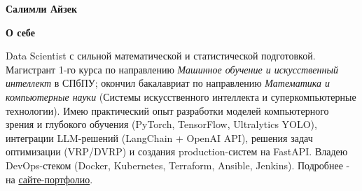 \documentclass[10pt,a4paper]{article}
\newlength{\mainwidth}\setlength{\mainwidth}{0.66\paperwidth}
\newlength{\mainpad}\setlength{\mainpad}{0.75cm}
\newcommand{\mainheading}[1]{%
  \vspace{8pt}%
  {\color{sidebar}\bfseries\Large #1}\par
  \vspace{-5pt}{\color{accent}\rule{\linewidth}{1.6pt}}\par\vspace{5pt}}
\begin{document}
\begin{minipage}[t]{\mainwidth}
  \hspace{\mainpad}%
  \begin{minipage}[t]{\dimexpr\linewidth-1.5\mainpad\relax}
    \vspace{0pt}
    \color{ink}
    {\color{sidebar}\fontsize{30}{34}\selectfont\bfseries Салимли Айзек}\par
    \par

    \mainheading{О себе}
    Data Scientist с сильной математической и статистической подготовкой. Магистрант 1-го курса
    по направлению \emph{Машинное обучение и искусственный интеллект} в СПбПУ; окончил бакалавриат
    по направлению \emph{Математика и компьютерные науки} (Системы искусственного интеллекта и суперкомпьютерные технологии). Имею
    практический опыт разработки моделей компьютерного зрения и глубокого обучения
    (PyTorch, TensorFlow, Ultralytics YOLO), интеграции LLM-решений (LangChain +
    OpenAI API), решения задач оптимизации (VRP/DVRP) и создания production-систем на
    FastAPI. Владею DevOps-стеком (Docker, Kubernetes, Terraform, Ansible, Jenkins).
    Подробнее - на \href{https://mathematiclove.github.io/my-cv/}{\color{accent}сайте-портфолио}.


\end{minipage}
\end{minipage}
\end{document}
